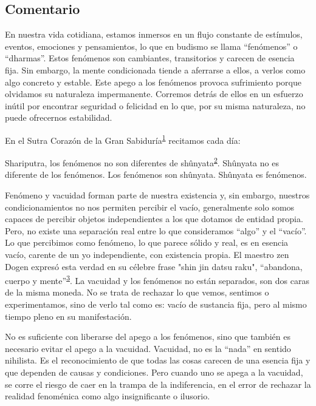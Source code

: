 \documentclass[
  a5paperpaper,
]{article}
\begin{document}
\hfill\break

\hypertarget{comentario-8}{%
\subsection{Comentario}\label{comentario-8}}

En nuestra vida cotidiana, estamos inmersos en un flujo constante de
estímulos, eventos, emociones y pensamientos, lo que en budismo se llama
``fenómenos'' o ``dharmas''. Estos fenómenos son cambiantes,
transitorios y carecen de esencia fija. Sin embargo, la mente
condicionada tiende a aferrarse a ellos, a verlos como algo concreto y
estable. Este apego a los fenómenos provoca sufrimiento porque olvidamos
su naturaleza impermanente. Corremos detrás de ellos en un esfuerzo
inútil por encontrar seguridad o felicidad en lo que, por su misma
naturaleza, no puede ofrecernos estabilidad.

En el Sutra Corazón de la Gran
Sabiduría\textsuperscript{\protect\hypertarget{ref1}{\protect\hyperlink{nota1}{1}}}
recitamos cada día:

Shariputra, los fenómenos no son diferentes de
shûnyata\textsuperscript{\protect\hypertarget{ref2}{\protect\hyperlink{nota2}{2}}}.
Shûnyata no es diferente de los fenómenos. Los fenómenos son shûnyata.
Shûnyata es fenómenos.

Fenómeno y vacuidad forman parte de nuestra existencia y, sin embargo,
nuestros condicionamientos no nos permiten percibir el vacío,
generalmente solo somos capaces de percibir objetos independientes a los
que dotamos de entidad propia. Pero, no existe una separación real entre
lo que consideramos ``algo'' y el ``vacío''. Lo que percibimos como
fenómeno, lo que parece sólido y real, es en esencia vacío, carente de
un yo independiente, con existencia propia. El maestro zen Dogen expresó
esta verdad en su célebre frase "shin jin datsu raku", ``abandona,
cuerpo y
mente''\textsuperscript{\protect\hypertarget{ref3}{\protect\hyperlink{nota3}{3}}}.
La vacuidad y los fenómenos no están separados, son dos caras de la
misma moneda. No se trata de rechazar lo que vemos, sentimos o
experimentamos, sino de verlo tal como es: vacío de sustancia fija, pero
al mismo tiempo pleno en su manifestación.

No es suficiente con liberarse del apego a los fenómenos, sino que
también es necesario evitar el apego a la vacuidad. Vacuidad, no es la
``nada'' en sentido nihilista. Es el reconocimiento de que todas las
cosas carecen de una esencia fija y que dependen de causas y
condiciones. Pero cuando uno se apega a la vacuidad, se corre el riesgo
de caer en la trampa de la indiferencia, en el error de rechazar la
realidad fenoménica como algo insignificante o ilusorio.
\end{document}

